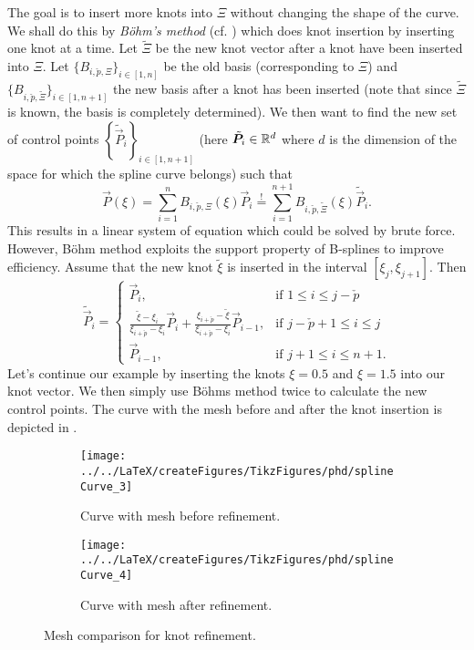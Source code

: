 The goal is to insert more knots into $\Xi$ without changing the shape of the curve. We shall do this by \textit{B\"{o}hm's method} (cf. \cite{Lyche2008smd}) which does knot insertion by inserting one knot at a time. Let $\tilde{\Xi}$ be the new knot vector after a knot have been inserted into $\Xi$. Let $\{B_{i,\check{p},\Xi}\}_{i\in [1,n]}$ be the old basis (corresponding to $\Xi$) and $\{B_{i,\check{p},\tilde{\Xi}}\}_{i\in [1,n+1]}$ the new basis after a knot has been inserted (note that since $\tilde{\Xi}$ is known, the basis is completely determined). We then want to find the new set of control points $\left\{\tilde{\vec{P}}_i\right\}_{i\in[1,n+1]}$ (here $\tilde{\vec{P}}_i\in\R^d$ where $d$ is the dimension of the space for which the spline curve belongs) such that
\begin{equation*}
	\vec{P}(\xi) = \sum_{i=1}^n B_{i,\check{p},\Xi}(\xi) \vec{P}_i \overset{!}{=} \sum_{i=1}^{n+1} B_{i,\check{p},\tilde{\Xi}}(\xi) \tilde{\vec{P}}_i.
\end{equation*}
This results in a linear system of equation which could be solved by brute force. However, B\"{o}hm method exploits the support property of B-splines to improve efficiency. Assume that the new knot $\tilde{\xi}$ is inserted in the interval $[\xi_j,\xi_{j+1}]$. Then 
\begin{equation*}
	\tilde{\vec{P}}_i = 
	\begin{cases}
		\vec{P}_i, & \text{if } 1\leq i\leq j-\check{p}\\
		\frac{\tilde{\xi}-\xi_i}{\xi_{i+\check{p}}-\xi_i} \vec{P}_i + \frac{\xi_{i+\check{p}} - \tilde{\xi}}{\xi_{i+\check{p}}-\xi_i} \vec{P}_{i-1}, & \text{if } j-\check{p}+1\leq i\leq j\\
		\vec{P}_{i-1}, & \text{if } j+1\leq i\leq n+1.
	\end{cases}
\end{equation*}
Let's continue our example by inserting the knots $\xi = 0.5$ and $\xi = 1.5$ into our knot vector. We then simply use B\"{o}hms method twice to calculate the new control points. The curve with the mesh before and after the knot insertion is depicted in . 
\begin{figure}
        \centering        
        \begin{subfigure}{0.49\textwidth}
       		\centering
			\texttt{[image: ../../LaTeX/createFigures/TikzFigures/phd/splineCurve\_3]}
            \caption{Curve with mesh before refinement.}
        \end{subfigure}%
        \hspace*{0.02\textwidth}%
        \begin{subfigure}{0.49\textwidth}
       		\centering
			\texttt{[image: ../../LaTeX/createFigures/TikzFigures/phd/splineCurve\_4]}
        	\caption{Curve with mesh after refinement.}
        \end{subfigure}
        \caption{Mesh comparison for knot refinement.}\label{Fig:splineCurveRefined}
\end{figure}
